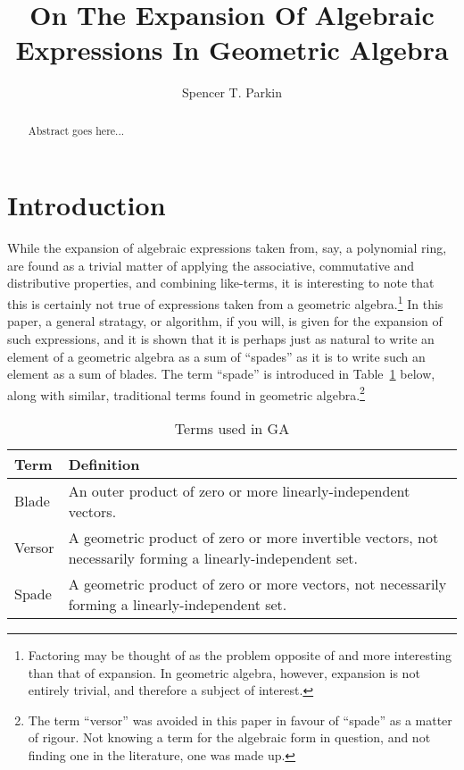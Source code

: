 \documentclass{birkjour}
\theoremstyle{definition}
\theoremstyle{remark}
\numberwithin{equation}{section}
\begin{document}
\title{On The Expansion Of Algebraic Expressions In Geometric Algebra}

\author{Spencer T. Parkin}



\begin{abstract}
Abstract goes here...
\end{abstract}


\maketitle

\section{Introduction}

While the expansion of algebraic expressions taken from, say, a polynomial ring, are found as a trivial matter
of applying the associative, commutative and distributive properties, and combining like-terms, it is interesting to note
that this is certainly not true of expressions taken from a geometric algebra.\footnote{Factoring may be thought of as the problem opposite of and more
interesting than that of expansion.  In geometric algebra, however, expansion is not entirely trivial, and therefore a subject of interest.}
In this paper, a general stratagy, or algorithm, if you will, is given for the expansion of such expressions, and it is shown that
it is perhaps just as natural to write an element of a geometric algebra as a sum of ``spades'' as it is to
write such an element as a sum of blades.  The term ``spade'' is introduced in Table~\ref{tbl_terms} below,
along with similar, traditional terms found in geometric algebra.\footnote{The term ``versor'' was avoided in
this paper in favour of ``spade'' as a matter of rigour.  Not knowing a term for the algebraic form in question, and not finding
one in the literature, one was made up.}

\begin{table}[H]\label{tbl_terms}\caption{Terms used in GA}
\begin{tabular}{p{1cm}p{9cm}}
Term & Definition \\
\hline
Blade & An outer product of zero or more linearly-independent vectors. \\
Versor & A geometric product of zero or more invertible vectors, not necessarily forming a linearly-independent set. \\
Spade & A geometric product of zero or more vectors, not necessarily forming a linearly-independent set.
\end{tabular}
\end{table}
\end{document}
